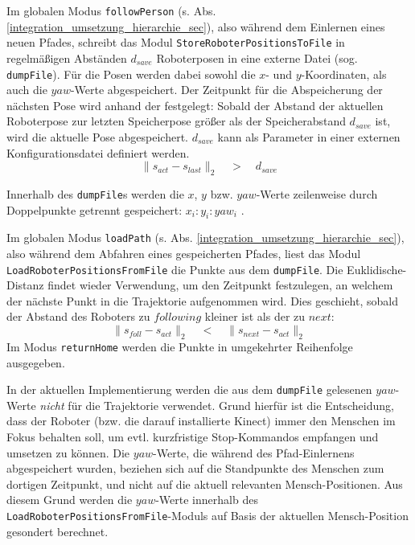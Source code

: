 Im globalen Modus \lstinline{followPerson} (s. Abs. \ref{integration_umsetzung_hierarchie_sec}), also während dem Einlernen eines neuen Pfades,
 schreibt das Modul \lstinline{StoreRoboterPositionsToFile} in regelmäßigen Abständen $d_{save}$ Roboterposen in eine externe Datei (sog. \lstinline{dumpFile}).
Für die Posen werden dabei sowohl die $x$- und $y$-Koordinaten, als auch die $yaw$-Werte abgespeichert.
Der Zeitpunkt für die Abspeicherung der nächsten Pose wird anhand der  festgelegt:
Sobald der Abstand der aktuellen Roboterpose zur letzten Speicherpose größer als der Speicherabstand $d_{save}$ ist, wird die aktuelle Pose abgespeichert.
$d_{save}$ kann als Parameter in einer externen Konfigurationsdatei definiert werden.
\begin{equation}
	\| s_{act} - s_{last}\|_2 \quad > \quad d_{save}
\end{equation}

Innerhalb des \lstinline{dumpFile}s werden die $x$, $y$ bzw. $yaw$-Werte zeilenweise durch Doppelpunkte getrennt gespeichert:
$x_i:y_i:yaw_i$
.

Im globalen Modus \lstinline{loadPath} (s. Abs. \ref{integration_umsetzung_hierarchie_sec}), also während dem Abfahren eines gespeicherten Pfades, liest das Modul \lstinline{LoadRoboterPositionsFromFile} die Punkte aus dem \lstinline{dumpFile}.
Die \gls{Euklidische-Distanz} findet wieder Verwendung, um den Zeitpunkt festzulegen, an welchem der nächste Punkt in die Trajektorie aufgenommen wird.
Dies geschieht, sobald der Abstand des Roboters zu $following$ kleiner ist als der zu $next$:
\begin{equation}
	\| s_{foll} - s_{act} \|_2 \quad < \quad \| s_{next} - s_{act} \|_2
\end{equation}
Im Modus \lstinline{returnHome} werden die Punkte in umgekehrter Reihenfolge ausgegeben.

In der aktuellen Implementierung werden die aus dem \lstinline{dumpFile} gelesenen $yaw$-Werte \emph{nicht} für die Trajektorie verwendet.
Grund hierfür ist die Entscheidung, dass der Roboter (bzw. die darauf installierte Kinect) immer den Menschen im Fokus behalten soll, um evtl. kurzfristige Stop-Kommandos empfangen und umsetzen zu können.
Die $yaw$-Werte, die während des Pfad-Einlernens abgespeichert wurden, beziehen sich auf die Standpunkte des Menschen zum dortigen Zeitpunkt, und nicht auf die aktuell relevanten Mensch-Positionen. 
Aus diesem Grund werden die $yaw$-Werte innerhalb des \lstinline{LoadRoboterPositionsFromFile}-Moduls auf Basis der aktuellen Mensch-Position gesondert berechnet.

